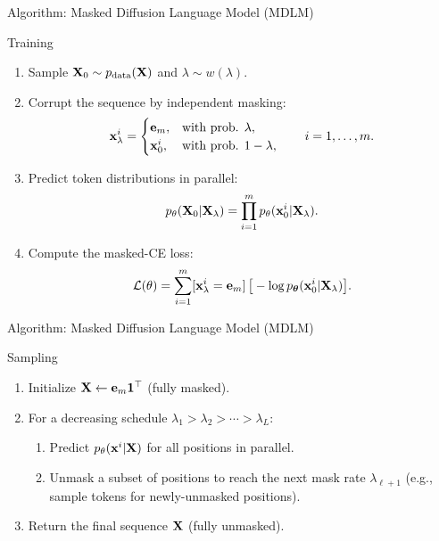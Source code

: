 \documentclass{beamer}
\begin{document}
\begin{frame}{Algorithm: Masked Diffusion Language Model (MDLM)}

	\begin{block}{Training}
		\begin{enumerate}
			\item Sample $\mathbf{X}_0 \sim p_{\text{data}}(\mathbf{X})$ and $\lambda \sim w(\lambda)$.
			\item Corrupt the sequence by independent masking:
			\[
				\mathbf{x}_\lambda^i =
				\begin{cases}
					\mathbf e_m, & \text{with prob. }\lambda,\\
					\mathbf{x}_0^i, & \text{with prob. }1-\lambda,
				\end{cases}
				\qquad i=1,\dots,m.
			\]
			\item Predict token distributions in parallel:
			\vspace{-0.3cm}
			\[
				p_\theta(\mathbf{X}_0 | \mathbf{X}_\lambda)
				=
				\prod_{i=1}^m p_\theta(\mathbf{x}_0^i | \mathbf{X}_\lambda).
			\]
			\vspace{-0.5cm}
			\item Compute the masked-CE loss:
			\vspace{-0.3cm}
			\[
				\mathcal{L}(\theta)
				=
				\sum_{i=1}^m [\mathbf{x}_\lambda^i=\mathbf e_m]\,
				\big[-\log p_{\boldsymbol{\theta}}(\mathbf{x}_0^i | \mathbf{X}_\lambda)\big].
			\]
		\end{enumerate}
	\end{block}

\end{frame}
\begin{frame}{Algorithm: Masked Diffusion Language Model (MDLM)}
	\begin{block}{Sampling}
		\begin{enumerate}
			\item Initialize $\mathbf{X} \leftarrow \mathbf e_m \mathbf 1^\top$ (fully masked).
			\item For a decreasing schedule $\lambda_1 > \lambda_2 > \cdots > \lambda_L$:
			\begin{enumerate}
				\item Predict $p_\theta(\mathbf{x}^i | \mathbf{X})$ for all positions in parallel.
				\item Unmask a subset of positions to reach the next mask rate $\lambda_{\ell+1}$
				(e.g., sample tokens for newly-unmasked positions).
			\end{enumerate}
			\item Return the final sequence $\mathbf{X}$ (fully unmasked).
		\end{enumerate}
	\end{block}
\end{frame}
\end{document}
